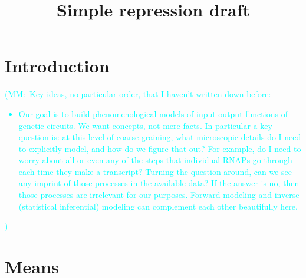 \documentclass[12pt]{article}%
\newcommand{\mmnote}[1]{\textcolor{cyan}{(MM:~#1)}}
\begin{document}
\title{Simple repression draft}

\maketitle

\section{Introduction}
\mmnote{Key ideas, no particular order, that I haven't written down before:
\begin{itemize}
\item Our goal is to build phenomenological models of input-output
functions of genetic circuits. We want concepts, not mere facts.
In particular a key question is: at this level of
coarse graining, what microscopic details do I need to explicitly
model, and how do we figure that out? For example, do I need to
worry about all or even any of the steps that individual RNAPs go
through each time they make a transcript? Turning the question
around, can we see any imprint of those processes in the
available data? If the answer is no, then those processes are
irrelevant for our purposes. Forward modeling and inverse
(statistical inferential) modeling can complement each other
beautifully here.
\end{itemize}}
\section{Means}
\end{document}
